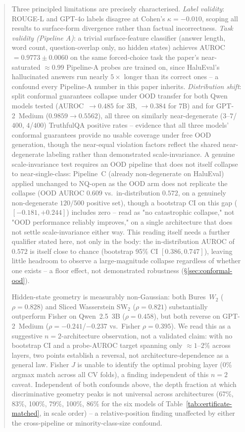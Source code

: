 \documentclass[10pt,twocolumn]{article}
\begin{document}
\begin{abstract}
Three principled limitations are precisely characterised.
\textit{Label validity}: ROUGE-L and GPT-4o labels disagree at Cohen's
$\kappa=-0.010$, scoping all results to surface-form divergence rather
than factual incorrectness. \textit{Task validity (Pipeline A)}: a
trivial surface-feature classifier (answer length, word count,
question-overlap only, no hidden states) achieves
AUROC$=0.9773\pm0.0060$ on the same forced-choice task the paper's
near-saturated $\approx$0.99 Pipeline-A probes are trained on, since
HaluEval's hallucinated answers run nearly $5\times$ longer than its
correct ones -- a confound every Pipeline-A number in this paper
inherits. \textit{Distribution shift}: split conformal guarantees
collapse under OOD transfer for both Qwen models tested
(AUROC~$\to0.485$ for 3B, $\to0.384$ for 7B) and for GPT-2~Medium
($0.9859\to0.5562$), all three on similarly near-degenerate
($3$--$7$/$400$, $4$/$400$) TruthfulQA positive rates -- evidence that
all three models' conformal guarantees provide no usable coverage
under free OOD generation, though the near-equal violation factors
reflect the shared near-degenerate labeling rather than demonstrated
scale-invariance. A genuine scale-invariance test requires an OOD
pipeline that does not itself collapse to near-single-class: Pipeline~C
(already non-degenerate on HaluEval) applied unchanged to NQ-open as
the OOD arm does not replicate the collapse (OOD AUROC $0.609$ vs.\
in-distribution $0.572$, on a genuinely non-degenerate $120/500$
positive set), though a bootstrap CI on this gap ($[-0.181,+0.244]$)
includes zero -- read as "no catastrophic collapse," not "OOD
performance reliably improves," on a single architecture that does not
settle scale-invariance either way. This reading itself needs a further
qualifier stated here, not only in the body: the in-distribution AUROC
of $0.572$ is itself close to chance (bootstrap 95\% CI
$[0.386,0.747]$), leaving little headroom to observe a large-magnitude
collapse regardless of whether one exists -- a floor effect, not
demonstrated robustness (\S\ref{sec:conformal-ood}).

Hidden-state geometry is measurably non-Gaussian: both Bures~$W_2$
($\rho=0.828$) and Sliced Wasserstein SW$_2$ ($\rho=0.821$)
substantially outperform Fisher on Qwen~2.5~3B ($\rho=0.458$), but both
reverse on GPT-2~Medium ($\rho=-0.241$/$-0.237$ vs.\ Fisher
$\rho=0.395$). We read this as a suggestive $n=2$-architecture
observation, not a validated claim: with no bootstrap CI and a
probe-AUROC target spanning only ${\approx}1$--$2\%$ across layers, two
points establish a reversal, not architecture-dependence as a general
law. Fisher $J$ is unable to identify the optimal probing layer (0\%
argmax match across all CV folds), a finding independent of this
$n=2$ caveat. Independent of both confounds above, the depth fraction
at which discriminative geometry peaks is not universal across
architectures (67\%, 83\%, 100\%, 79\%, 100\%, 86\% for the six models
of Table~\ref{tab:certificate-matched}, in scale order) -- a
relative-position finding unaffected by either the cross-pipeline or
minority-class-size confound.


\end{abstract}
\end{document}
